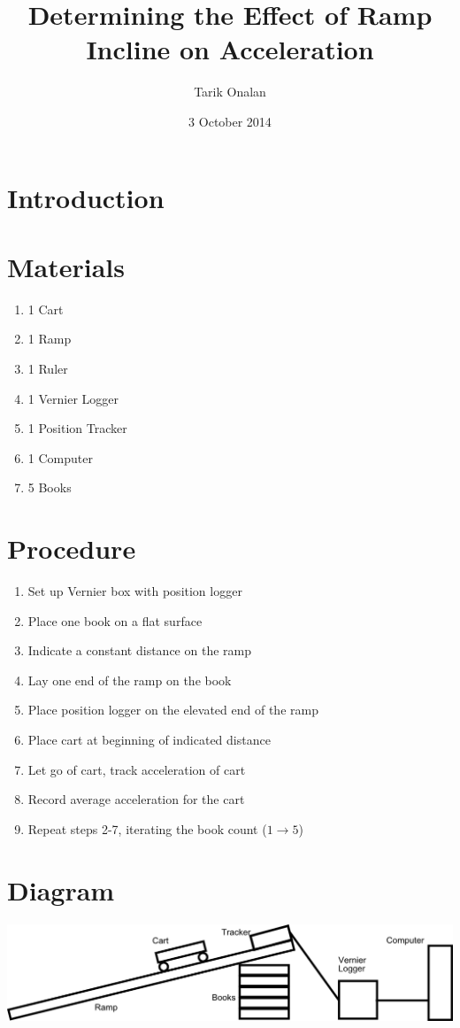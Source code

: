 \documentclass{article}
\title{Determining the Effect of Ramp Incline on Acceleration}
\date{3 October 2014}
\author{Tarik Onalan}
\begin{document}
    \maketitle
    \section{Introduction}
    \section{Materials}
        \begin{enumerate}
            \item 1 Cart
            \item 1 Ramp
            \item 1 Ruler
            \item 1 Vernier Logger
            \item 1 Position Tracker
            \item 1 Computer
            \item 5 Books
        \end{enumerate}
    \section{Procedure}
        \begin{enumerate}
            \item Set up Vernier box with position logger
            \item Place one book on a flat surface
            \item Indicate a constant distance on the ramp
            \item Lay one end of the ramp on the book
            \item Place position logger on the elevated end of the ramp
            \item Place cart at beginning of indicated distance
            \item Let go of cart, track acceleration of cart
            \item Record average acceleration for the cart
            \item Repeat steps 2-7, iterating the book count (\(1\to5\))
        \end{enumerate}
    \section{Diagram}
        \includegraphics[width=\textwidth]{diagram}
\end{document}
